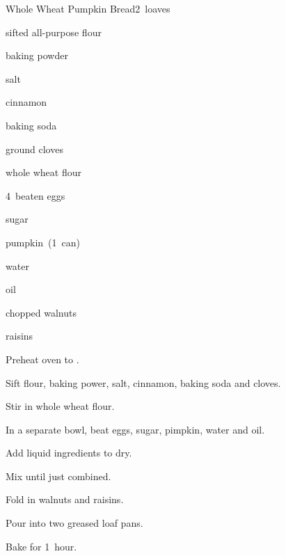 \begin{recipe}{Whole Wheat Pumpkin Bread}{}{2~loaves}

\begin{ingredients}
\item {} sifted all-purpose flour
\item {} baking powder
\item \tp{1\half} salt
\item {} cinnamon
\item \tp{\twothird} baking soda
\item \tp{\half} ground cloves
\item \C{1\half} whole wheat flour
\item 4~beaten eggs
\item {} sugar
\item \C{2\quarter} pumpkin~(1~can)
\item \C{\twothird} water
\item \C{\half} oil
\item \C{\threequarter} chopped walnuts
\item \C{\threequarter} raisins
\end{ingredients}

\begin{directions}
\item Preheat oven to .
\item Sift flour, baking power, salt, cinnamon, baking soda and cloves.
\item Stir in whole wheat flour.
\item In a separate bowl, beat eggs, sugar, pimpkin, water and oil.
\item Add liquid ingredients to dry.
\item Mix until just combined.
\item Fold in walnuts and raisins.
\item Pour into two greased loaf pans.
\item Bake for 1~hour.
\end{directions}

\end{recipe}
